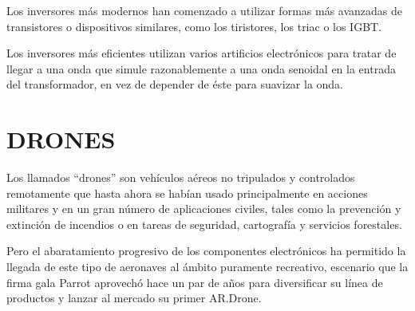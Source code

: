 \documentclass[12pt]{article}
\begin{document}
\vspace{15PT}
Los inversores más modernos han comenzado a utilizar formas más avanzadas de transistores o dispositivos similares, como los tiristores, los triac o los IGBT.

\vspace{15PT}
Los inversores más eficientes utilizan varios artificios electrónicos para tratar de llegar a una onda que simule razonablemente a una onda senoidal en la entrada del transformador, en vez de depender de éste para suavizar la onda.


\vspace{30pt}
\section{DRONES}

Los llamados “drones” son vehículos aéreos no tripulados y controlados remotamente que hasta ahora se habían usado principalmente en acciones militares y en un gran número de aplicaciones civiles, tales como la prevención y extinción de incendios o en tareas de seguridad, cartografía y servicios forestales.

Pero el abaratamiento progresivo de los componentes electrónicos ha permitido la llegada de este tipo de aeronaves al ámbito puramente recreativo, escenario que la firma gala Parrot aprovechó hace un par de años para diversificar su línea de productos y lanzar al mercado su primer AR.Drone.

 
\end{document}
